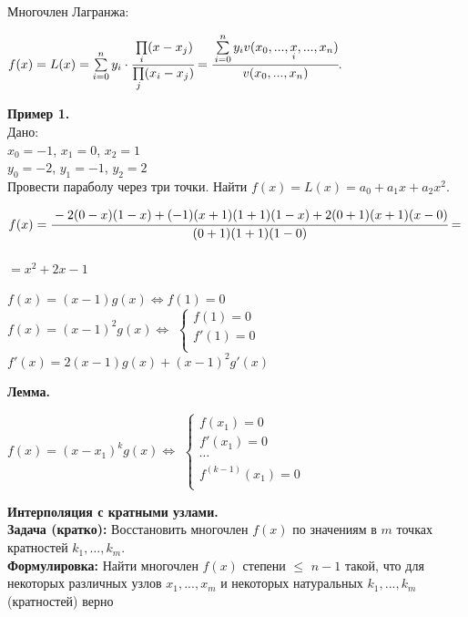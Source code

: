 \documentclass[12pt]{article}
\theoremstyle{definition}
\numberwithin{equation}{section}
\begin{document}
	Многочлен Лагранжа: \begin{center}$f(x)=L(x) = \sum\limits_{i=0}^{n} y_i \cdot \cfrac{\prod\limits_i (x-x_j)}{\prod\limits_j (x_i-x_j)} = \cfrac{\sum\limits_{i=0}^n y_i v(x_0,..., \underset{i}{x},..., x_n)}{v(x_0,..., x_n)}.$\end{center}
	\noindent \textbf{Пример 1.}\\
	Дано:\\
	$x_0 = -1$, $x_1 = 0$, $x_2 = 1$\\
	$y_0 = -2$, $y_1 = -1$, $y_2 = 2$\\
	Провести параболу через три точки. Найти $f(x) = L(x) = a_0+a_1x+a_2x^2$.\\
	\begin{center} $f(x) = \cfrac{-2(0-x)(1-x)+(-1)(x+1)(1+1)(1-x)+2(0+1)(x+1)(x-0)}{(0+1)(1+1)(1-0)} =$\\~\\$= x^2+2x-1$ \end{center}
	\begin{center}
		$f(x) = (x-1)g(x) \Leftrightarrow f(1) = 0$\\
		$f(x) = (x-1)^2g(x) \Leftrightarrow$ 
		$  
		\left\{  
		\begin{array}{lcl}  
		f(1) = 0 \\  
		f'(1) = 0 \\  
		\end{array}   
		\right.  
		$
		\\
		$f'(x) = 2(x-1)g(x)+(x-1)^2g'(x)$
	\end{center}
	\noindent \textbf{Лемма.}
	\begin{center}
		$f(x) = (x-x_1)^kg(x) \Leftrightarrow$ 
		$  
		\left\{  
		\begin{array}{lcl}  
		f(x_1) = 0 \\  
		f'(x_1) = 0 \\
		\cdots\\
		f^{(k-1)}(x_1) = 0\\
		\end{array}   
		\right.  
		$
	\end{center}
	\noindent \textbf{Интерполяция с кратными узлами.}\\
	\textbf{Задача (кратко):}
	Восстановить многочлен $f(x)$ по значениям в $m$ точках кратностей $k_1,..., k_m$.\\
	\textbf{Формулировка:}
	Найти многочлен $f(x)$ степени $\leq$ $n-1$ такой, что для некоторых различных узлов $x_1,...,x_m$ и некоторых натуральных $k_1,...,k_m$ (кратностей) верно\\
\end{document}
